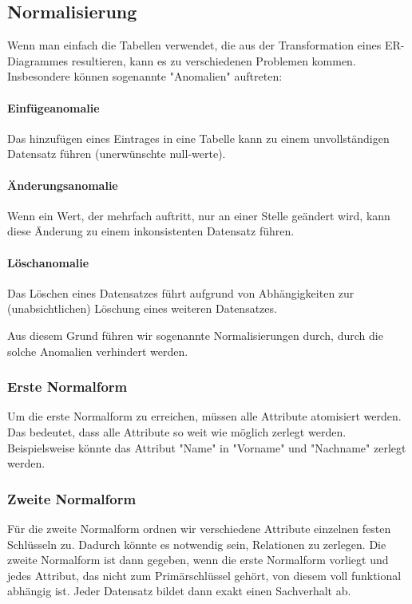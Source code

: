 \documentclass{article}
\begin{document}
	\subsection{Normalisierung}
	Wenn man einfach die Tabellen verwendet, die aus der Transformation eines ER-Diagrammes resultieren, kann es zu verschiedenen Problemen kommen. Insbesondere können sogenannte "Anomalien" auftreten:

	\paragraph{Einfügeanomalie}
	Das hinzufügen eines Eintrages in eine Tabelle kann zu einem unvollständigen Datensatz führen (unerwünschte null-werte).

	\paragraph{Änderungsanomalie}
	Wenn ein Wert, der mehrfach auftritt, nur an einer Stelle geändert wird, kann diese Änderung zu einem inkonsistenten Datensatz führen.

	\paragraph{Löschanomalie}
	Das Löschen eines Datensatzes führt aufgrund von Abhängigkeiten zur (unabsichtlichen) Löschung eines weiteren Datensatzes.

	Aus diesem Grund führen wir sogenannte Normalisierungen durch, durch die solche Anomalien verhindert werden.

	\subsubsection{Erste Normalform}
	Um die erste Normalform zu erreichen, müssen alle Attribute atomisiert werden. Das bedeutet, dass alle Attribute so weit wie möglich zerlegt werden.
	Beispielsweise könnte das Attribut "Name" in "Vorname" und "Nachname" zerlegt werden.

	\subsubsection{Zweite Normalform}
	Für die zweite Normalform ordnen wir verschiedene Attribute einzelnen festen Schlüsseln zu. Dadurch könnte es notwendig sein, Relationen zu zerlegen. Die zweite Normalform ist dann gegeben, wenn die erste Normalform vorliegt und jedes Attribut, das nicht zum Primärschlüssel gehört, von diesem voll funktional abhängig ist. Jeder Datensatz bildet dann exakt einen Sachverhalt ab.
\end{document}
